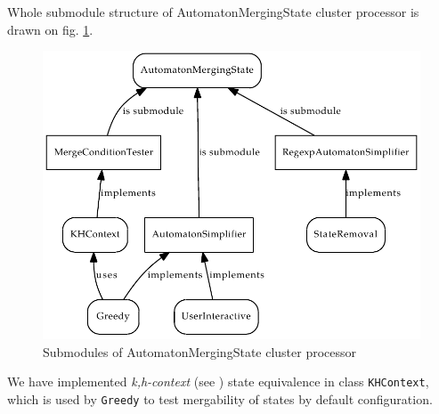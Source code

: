\documentclass[a4paper,10pt,oneside]{article}
\newcommand{\myscale}{0.74}
\newcommand{\code}[1]{\texttt{#1}}
\begin{document}
Whole submodule structure of AutomatonMergingState cluster processor is drawn on fig. \ref{automaton_merging_state_modules}.
\begin{figure}
	\centering\includegraphics[scale=\myscale]{automaton_merging_state_modules}
	\caption{Submodules of AutomatonMergingState cluster processor} \label{automaton_merging_state_modules}
\end{figure}
We have implemented \emph{k,h-context} (see \cite{ahonen}) state equivalence in class \code{KHContext}, which is used by \code{Greedy}
to test mergability of states by default configuration.
\end{document}
